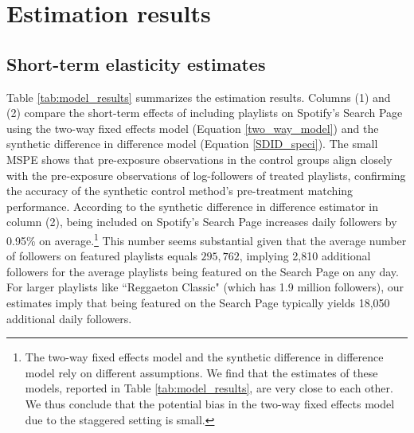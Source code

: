\section{Estimation results}
\label{results}



\subsection{Short-term elasticity estimates}

Table \ref{tab:model_results} summarizes the estimation results. Columns (1) and (2) compare the short-term effects of including playlists on Spotify's Search Page using the two-way fixed effects model (Equation \ref{two_way_model}) and the synthetic difference in difference model (Equation \ref{SDID_speci}). %
The small MSPE %
shows that pre-exposure observations in the control groups align closely with the pre-exposure observations of log-followers of treated playlists, confirming the accuracy of the synthetic control method's pre-treatment matching performance. 
According to the synthetic difference in difference estimator in column (2), being included on Spotify's Search Page increases daily followers by 0.95\% on average.\footnote{The two-way fixed effects model and the synthetic difference in difference model rely on different assumptions. We find that the estimates of these models, reported in Table \ref{tab:model_results}, are very close to each other. We thus conclude that the potential bias in the two-way fixed effects model due to the staggered setting is small.} This number seems substantial given that the average number of followers on featured playlists equals $295,762$, implying 2,810 additional followers for the average playlists being featured on the Search Page on any day. 
For larger playlists like ``Reggaeton Classic" (which has 1.9 million followers), our estimates imply that being featured on the Search Page typically yields 18,050 additional daily followers. 

